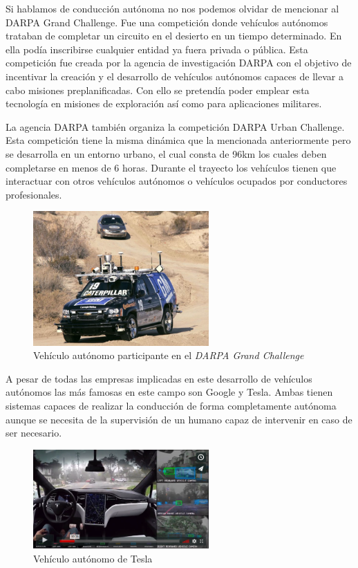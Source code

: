 Si hablamos de conducción autónoma no nos podemos olvidar de mencionar al DARPA Grand Challenge. Fue una competición donde vehículos autónomos trataban de completar un circuito en el desierto en un tiempo determinado. En ella podía inscribirse cualquier entidad ya fuera privada o pública. Esta competición fue creada por la agencia de investigación DARPA con el objetivo de incentivar la creación y el desarrollo de vehículos autónomos capaces de  llevar a cabo misiones preplanificadas. Con ello se pretendía poder emplear esta tecnología en misiones de exploración así como para aplicaciones militares.


La agencia DARPA también organiza la competición DARPA Urban Challenge. Esta competición tiene la misma dinámica que la mencionada anteriormente pero se desarrolla en un entorno urbano, el cual consta de 96km los cuales deben completarse en menos de 6 horas. Durante el trayecto los vehículos tienen que interactuar con otros vehículos autónomos o vehículos ocupados por conductores profesionales. 

\begin{figure}[H]
  \begin{center}
    \includegraphics[width=0.6\textwidth]{figures/Introduccion/darpa.jpg}
		\caption{ Vehículo autónomo participante en el \textit{DARPA Grand Challenge}}
		\label{fig.darpa}
		\end{center}
\end{figure}


A pesar de todas las empresas implicadas en este desarrollo de vehículos autónomos las más famosas en este campo son Google y Tesla. Ambas tienen sistemas capaces de realizar la conducción de forma completamente autónoma aunque se necesita de la supervisión de un humano capaz de intervenir en caso de ser necesario.

\begin{figure}[H]
  \begin{center}
    \includegraphics[width=0.6\textwidth]{figures/Introduccion/tesla.png}
		\caption{ Vehículo autónomo de Tesla}
		\label{fig.tesla}
		\end{center}
\end{figure}

